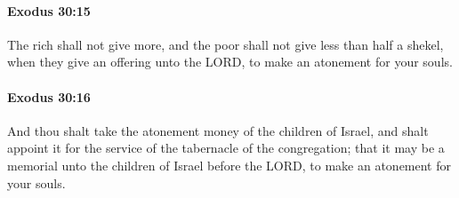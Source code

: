 		\paragraph{Exodus 30:15} %
			\label{EXODUS-30-15}

			The rich shall not give more, and the poor shall not give less than half a shekel, when they give an offering unto the LORD, to make an atonement for your souls.


		\paragraph{Exodus 30:16} %
			\label{EXODUS-30-16}

			And thou shalt take the atonement money of the children of Israel, and shalt appoint it for the service of the tabernacle of the congregation; that it may be a memorial unto the children of Israel before the LORD, to make an atonement for your souls.

